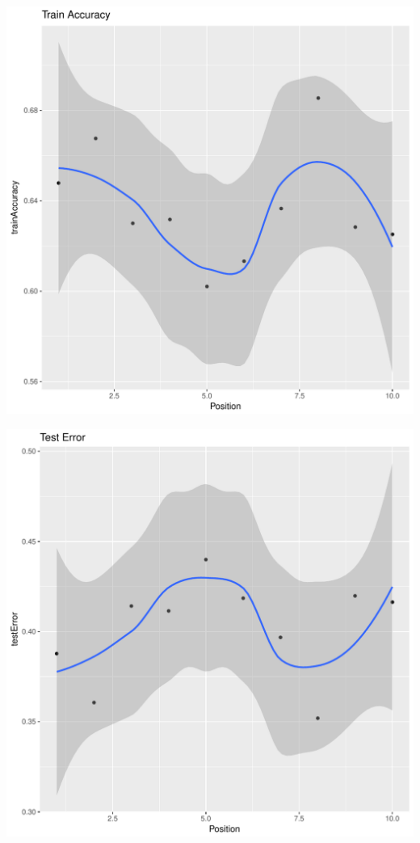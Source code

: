 \documentclass{article}\usepackage[]{graphicx}\usepackage[]{color}
\makeatletter
\def\maxwidth{ %
  \ifdim\Gin@nat@width>\linewidth
    \linewidth
  \else
    \Gin@nat@width
  \fi
}
\newenvironment{kframe}{%
 \def\at@end@of@kframe{}%
 \ifinner\ifhmode%
  \def\at@end@of@kframe{\end{minipage}}%
  \begin{minipage}{\columnwidth}%
 \fi\fi%
 \def\FrameCommand##1{\hskip\@totalleftmargin \hskip-\fboxsep
 \colorbox{shadecolor}{##1}\hskip-\fboxsep
     \hskip-\linewidth \hskip-\@totalleftmargin \hskip\columnwidth}%
 \MakeFramed {\advance\hsize-\width
   \@totalleftmargin\z@ \linewidth\hsize
   \@setminipage}}%
 {\par\unskip\endMakeFramed%
 \at@end@of@kframe}
\newenvironment{knitrout}{}{} %
\makeatother
\begin{document}
\begin{knitrout}
\begin{kframe}
{\ttfamily\noindent\itshape\color{messagecolor}{\#\# `geom\_smooth()` using method = 'loess'}}\end{kframe}
\includegraphics[width=\maxwidth]{figure/unnamed-chunk-39-4} 
\begin{kframe}

{\ttfamily\noindent\itshape\color{messagecolor}{\#\# `geom\_smooth()` using method = 'loess'}}\end{kframe}
\includegraphics[width=\maxwidth]{figure/unnamed-chunk-39-5} 
\begin{kframe}


\end{kframe}
\end{knitrout}
\end{document}
